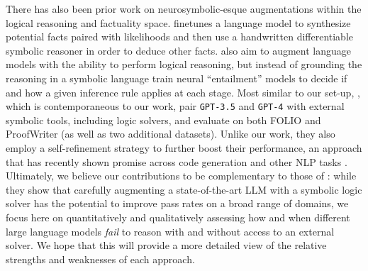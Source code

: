 \documentclass[11pt]{article}
\newcommand{\txo}[1]{\textcolor{blue}{}}
\newcommand{\txo}[1]{\textcolor{blue}{\bf\small [TXO: #1]}}
\newcommand{\ag}[1]{\textcolor{purple}{}}
\newcommand{\ag}[1]{\textcolor{red}{\bf\small [AG: #1]}}
\begin{document}
There has also been prior work on neurosymbolic-esque augmentations within the logical reasoning and factuality space.
\citet{zhang22improved} finetunes a language model to synthesize potential facts paired with likelihoods and then use a handwritten differentiable symbolic reasoner in order to deduce other facts. 
\citet{weir2022dynamic} also aim to augment language models with the ability to perform logical reasoning,
but instead of grounding the reasoning in a symbolic language train neural ``entailment'' models to decide if and how a given inference rule applies at each stage. 
Most similar to our set-up, \citet{pan2023logic}, which is contemporaneous to our work, pair \texttt{GPT-3.5} and \texttt{GPT-4} with external symbolic tools, including logic solvers, and evaluate on both FOLIO and ProofWriter (as well as two additional datasets).
Unlike our work, they also employ a self-refinement strategy to further boost their performance,
an approach that has recently shown promise across code generation and other NLP tasks
\cite{zhang2023selfedit,chen2023teaching,peng2023check,madaan2023selfrefine,olausson2023demystifying}.
Ultimately, we believe our contributions to be complementary to those of \citet{pan2023logic}:
while they show that carefully augmenting a state-of-the-art LLM with a symbolic logic solver has the potential to improve pass rates on a broad range of domains,
we focus here on quantitatively and qualitatively assessing how and when different large language models \emph{fail} to reason with and without access to an external solver.
We hope that this will provide a more detailed view of the relative strengths and weaknesses of each approach. 


\end{document}
